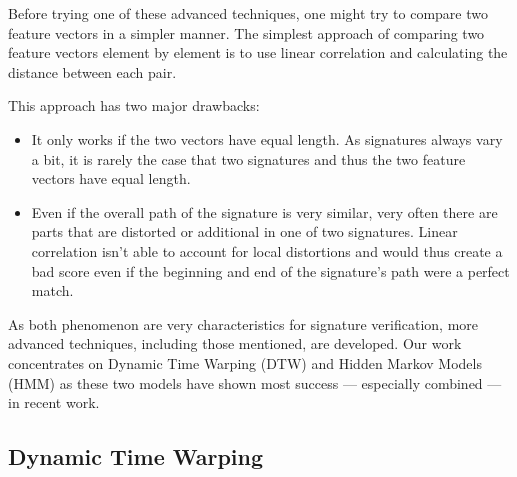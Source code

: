 \documentclass[a4paper, oneside]{csthesis}
\begin{document}


Before trying one of these advanced techniques, one might try to compare two feature vectors in a simpler manner.
The simplest approach of comparing two feature vectors element by element is to use linear correlation \cite{Plamondon1989107} and calculating the distance between each pair.

This approach has two major drawbacks:
\begin{itemize}
\item It only works if the two vectors have equal length. As signatures always vary a bit, it is rarely the case that two signatures and thus the two feature vectors have equal length.
\item Even if the overall path of the signature is very similar, very often there are parts that are distorted or additional in one of two signatures. Linear correlation isn't able to account for local distortions and would thus create a bad score even if the beginning and end of the signature's path were a perfect match.
\end{itemize}

As both phenomenon are very characteristics for signature verification, more advanced techniques, including those mentioned, are developed. Our work concentrates on Dynamic Time Warping (DTW) and Hidden Markov Models (HMM) as these two models have shown most success --- especially combined --- in recent work.


\subsection{Dynamic Time Warping}
\end{document}
